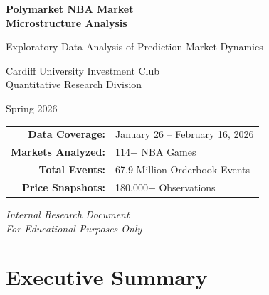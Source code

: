 \documentclass[11pt, a4paper]{report}
\begin{document}
\begin{titlepage}
    \centering
    \vspace*{2cm}

    {\Huge\bfseries\color{cuicblue} Polymarket NBA Market\\[0.3cm] Microstructure Analysis}

    \vspace{1cm}

    {\Large Exploratory Data Analysis of Prediction Market Dynamics}

    \vspace{2cm}

    {\large Cardiff University Investment Club}\\[0.5cm]
    {\large Quantitative Research Division}

    \vspace{1.5cm}

    {\large Spring 2026}

    \vspace{2cm}

    \begin{tabular}{rl}
        \textbf{Data Coverage:} & January 26 -- February 16, 2026 \\[0.3cm]
        \textbf{Markets Analyzed:} & 114+ NBA Games \\[0.3cm]
        \textbf{Total Events:} & 67.9 Million Orderbook Events \\[0.3cm]
        \textbf{Price Snapshots:} & 180,000+ Observations \\
    \end{tabular}

    \vfill

    \textit{Internal Research Document}\\
    \textit{For Educational Purposes Only}

\end{titlepage}

\newpage
\chapter*{Executive Summary}
\end{document}
